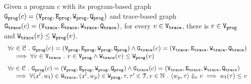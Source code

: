 \begin{lem}
	\label{lem:weights_map}
	Given a program $c$ with its
	program-based graph $\progG({c}) = (\progV, \progE, \progW, \progF)$
	and 
	trace-based graph $\traceG({c}) = (\traceV, \traceE, \traceW, \traceF)$,
	for every $v \in \traceV$, there is $v \in \progV$ and $\traceW(v) \leq \progW(v)$.
%
%
\[
	\begin{array}{l}
	\forall c \in \cdom 
	 \st 
	 \progG({c}) = (\progV, \progE, \progW, \progF)
	\land 
	\traceG({c}) = (\traceV, \traceE, \traceW, \traceF)
	\\ \quad
	\implies
	\forall v \in \traceV \st 
	v \in \progV \land
	\traceW(v) \leq \progW(v)
	\end{array}
	\]
	\[
		\begin{array}{l}
			\forall c \in \cdom 
			 \st 
			 \progG({c}) = (\progV, \progE, \progW, \progF)
			\land 
			\traceG({c}) = (\traceV, \traceE, \traceW, \traceF)
			\\ \quad
			\implies
			\forall (x^l, w_{t}) \in \traceW,
			(x^l, w_{p}) \in \progW, \vtrace, \trace' \in \mathcal{T}, v \in \mathbb{N} \st
			\config{w_{p}, \trace} \earrow v
			\implies
			w_{t}(\trace) \leq v
		\end{array}
		\]
	\end{lem}

